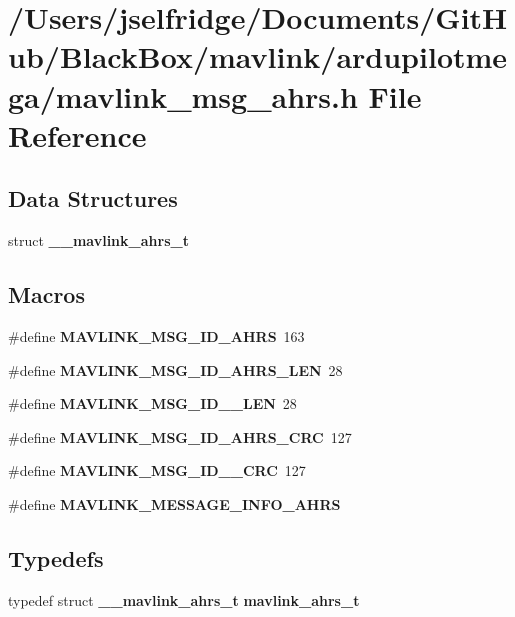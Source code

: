 \section{/\+Users/jselfridge/\+Documents/\+Git\+Hub/\+Black\+Box/mavlink/ardupilotmega/mavlink\+\_\+msg\+\_\+ahrs.h File Reference}
\label{mavlink__msg__ahrs_8h}
\subsection*{Data Structures}
\begin{DoxyCompactItemize}
\item 
struct \textbf{ \+\_\+\+\_\+mavlink\+\_\+ahrs\+\_\+t}
\end{DoxyCompactItemize}
\subsection*{Macros}
\begin{DoxyCompactItemize}
\item 
\#define \textbf{ M\+A\+V\+L\+I\+N\+K\+\_\+\+M\+S\+G\+\_\+\+I\+D\+\_\+\+A\+H\+RS}~163
\item 
\#define \textbf{ M\+A\+V\+L\+I\+N\+K\+\_\+\+M\+S\+G\+\_\+\+I\+D\+\_\+\+A\+H\+R\+S\+\_\+\+L\+EN}~28
\item 
\#define \textbf{ M\+A\+V\+L\+I\+N\+K\+\_\+\+M\+S\+G\+\_\+\+I\+D\+\_\+\_\+\+L\+EN}~28
\item 
\#define \textbf{ M\+A\+V\+L\+I\+N\+K\+\_\+\+M\+S\+G\+\_\+\+I\+D\+\_\+\+A\+H\+R\+S\+\_\+\+C\+RC}~127
\item 
\#define \textbf{ M\+A\+V\+L\+I\+N\+K\+\_\+\+M\+S\+G\+\_\+\+I\+D\+\_\+\_\+\+C\+RC}~127
\item 
\#define \textbf{ M\+A\+V\+L\+I\+N\+K\+\_\+\+M\+E\+S\+S\+A\+G\+E\+\_\+\+I\+N\+F\+O\+\_\+\+A\+H\+RS}
\end{DoxyCompactItemize}
\subsection*{Typedefs}
\begin{DoxyCompactItemize}
\item 
typedef struct \textbf{ \+\_\+\+\_\+mavlink\+\_\+ahrs\+\_\+t} \textbf{ mavlink\+\_\+ahrs\+\_\+t}
\end{DoxyCompactItemize}


